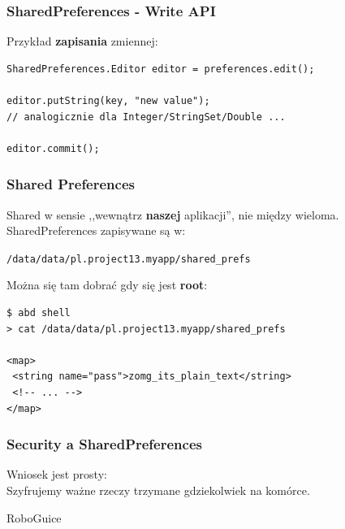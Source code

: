 \documentclass{beamer}
\begin{document}
\begin{frame}[fragile]\frametitle{SharedPreferences - Write API}
 Przykład \textbf{zapisania} zmiennej:
\begin{lstlisting}
SharedPreferences.Editor editor = preferences.edit();

editor.putString(key, "new value");
// analogicznie dla Integer/StringSet/Double ...

editor.commit();
\end{lstlisting}
\end{frame}


\begin{frame}[fragile]\frametitle{Shared Preferences}
 Shared w sensie ,,wewnątrz \textbf{naszej} aplikacji'', nie między wieloma.\\
 SharedPreferences zapisywane są w: \\
 \begin{center}
  \texttt{/data/data/pl.project13.myapp/shared\_prefs} 
 \end{center}

\pause

Można się tam dobrać gdy się jest \textbf{root}:
\begin{verbatim}
$ abd shell
> cat /data/data/pl.project13.myapp/shared_prefs

<map>
 <string name="pass">zomg_its_plain_text</string>
 <!-- ... -->
</map>
\end{verbatim}
\end{frame}


\begin{frame}\frametitle{Security a SharedPreferences}
\begin{center}
 Wniosek jest prosty:\\ 
 Szyfrujemy ważne rzeczy trzymane gdziekolwiek na komórce.
\end{center}
\end{frame}

\begin{frame}
 \begin{center}
  \Huge{RoboGuice}
 \end{center}

\end{frame}
\end{document}
